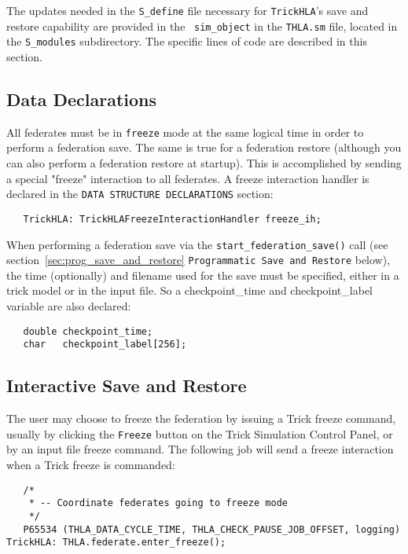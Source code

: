 The updates needed in the {\tt S\_define} file necessary for {\tt TrickHLA}'s save and restore capability are provided in the
\TrickHLA\ {\tt sim\_object} in the {\tt THLA.sm} file, located in the
{\tt S\_modules} subdirectory. The specific lines of code are described in this section.

\subsection{Data Declarations}

All federates must be in {\tt freeze} mode at the same logical time in order to perform a federation save.
The same is true for a federation restore (although you can also perform a federation restore at startup).
This is accomplished by sending a special "freeze" interaction to all federates. A freeze interaction handler
is declared in the {\tt DATA STRUCTURE DECLARATIONS} section:

\begin{verbatim}
   TrickHLA: TrickHLAFreezeInteractionHandler freeze_ih;
\end{verbatim}

When performing a federation save via the {\tt start\_federation\_save()} call 
(see section~\ref{sec:prog_save_and_restore} {\tt Programmatic Save and Restore} below),
the time (optionally) and filename used for the save must be specified, either in a trick model or in the input file.
So a checkpoint\_time and checkpoint\_label variable are also declared:

\begin{verbatim}
   double checkpoint_time;
   char   checkpoint_label[256];
\end{verbatim}

\subsection{Interactive Save and Restore}

The user may choose to freeze the federation by issuing a Trick freeze command, usually by clicking
the {\tt Freeze} button on the Trick Simulation Control Panel, or by an input file freeze command. The following
job will send a freeze interaction when a Trick freeze is commanded:

\begin{verbatim}
   /*
    * -- Coordinate federates going to freeze mode
    */
   P65534 (THLA_DATA_CYCLE_TIME, THLA_CHECK_PAUSE_JOB_OFFSET, logging) TrickHLA: THLA.federate.enter_freeze();
\end{verbatim}

